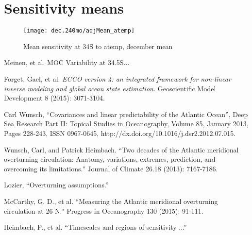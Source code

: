 \documentclass[a4paper,11pt]{article}
\begin{document}
 \section{Sensitivity means}

   \begin{figure}
    \centering
    \texttt{[image: dec.240mo/adjMean\_atemp]}
    \caption{Mean sensitivity at 34S to atemp, december mean}
    \label{fig:decatemp}
   \end{figure}


\begin{thebibliography}{3}

  Meinen, et al. MOC Variability at 34.5S...
  
  Forget, Gael, et al. \textit{ECCO version 4: an integrated framework for non-linear inverse modeling and global ocean state estimation.} Geoscientific Model Development 8 (2015): 3071-3104.
  
  Carl Wunsch, ``Covariances and linear predictability of the Atlantic Ocean'', Deep Sea Research Part II: Topical Studies in Oceanography, Volume 85, January 2013, Pages 228-243, ISSN 0967-0645, http://dx.doi.org/10.1016/j.dsr2.2012.07.015.
  
  Wunsch, Carl, and Patrick Heimbach. ``Two decades of the Atlantic meridional overturning circulation: Anatomy, variations, extremes, prediction, and overcoming its limitations." Journal of Climate 26.18 (2013): 7167-7186.
  
  Lozier, ``Overturning assumptions.'' 

  McCarthy, G. D., et al. ``Measuring the Atlantic meridional overturning circulation at 26 N." Progress in Oceanography 130 (2015): 91-111.

  Heimbach, P., et al. ``Timescales and regions of sensitivity ...''

\end{thebibliography}
\end{document}

